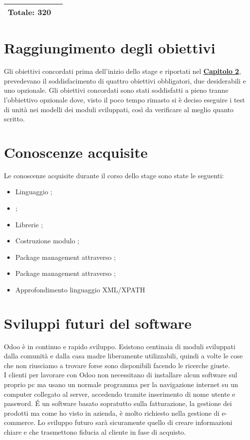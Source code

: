 \begin{center}
\begin{tabular}{|l|l|c l|}
		\hline
		
		\multicolumn{2}{|l|}{\textbf{Totale: 320}} & \multicolumn{2}{l|}{}\\
		\hline
		
	\end{tabular}
	\label{tab:consuntivo_finale}  
\end{center}
\section{Raggiungimento degli obiettivi}
Gli obiettivi concordati prima dell'inizio dello stage e riportati nel \hyperlink{(chap:capitolo2)}{\textbf{Capitolo 2}}, prevedevano il soddisfacimento di quattro obiettivi obbligatori, due desiderabili e uno opzionale.
Gli obiettivi concordati sono stati soddisfatti a pieno tranne l'obbiettivo opzionale dove, visto il poco tempo rimasto si è deciso eseguire i test di unità nei modelli dei moduli sviluppati, così da verificare al meglio quanto scritto.\\
\newpage
\section{Conoscenze acquisite}
Le conoscenze acquisite durante il corso dello stage sono state le seguenti:
\begin{itemize}
	\item Linguaggio ;
	\item {};
	\item Librerie ;
	\item Costruzione modulo ;
	\item Package management attraverso ;
	\item Package management attraverso ;
	\item Approfondimento linguaggio XML/XPATH

\end{itemize}


\section{Sviluppi futuri del software}
Odoo è in continuo e rapido sviluppo. Esistono centinaia di moduli sviluppati dalla comunità e dalla casa madre liberamente utilizzabili, quindi a volte le cose che non riusciamo a trovare forse sono disponibili facendo le ricerche giuste. \\
I clienti per lavorare con Odoo non necessitano
di installare alcun software sul proprio pc ma usano un normale
programma per la navigazione internet su un computer collegato al
server, accedendo tramite inserimento di nome utente e password.
\'E un software basato sopratutto sulla fatturazione, la gestione dei prodotti ma come ho visto in azienda, è molto richiesto nella gestione di e-commerce. Lo sviluppo futuro sarà sicuramente quello di creare informazioni chiare e che trasmettono fiducia al cliente in fase di acquisto.


